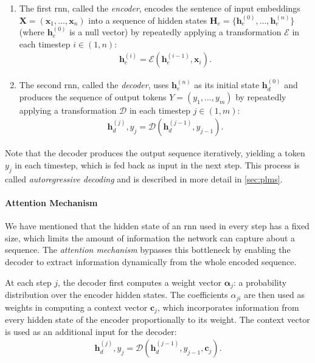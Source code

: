 {\begin{enumerate}
    \item The first \ac{rnn}, called the \emph{encoder}, encodes the sentence of input embeddings $\mathbf{X}= (\mathbf{x}_1, \ldots, \mathbf{x}_n)$ into a sequence of hidden states $\mathbf{H}_e = \{\mathbf{h}_e^{(0)}, \ldots, \mathbf{h}_e^{(n)}\}$ (where $\mathbf{h}_e^{(0)}$ is a null vector) by repeatedly applying a transformation $\mathcal{E}$ in each timestep $i\in(1,n)$:
          \begin{align}
              \mathbf{h}_e^{(i)} = \mathcal{E}(\mathbf{h}_e^{(i-1)}, \mathbf{x}_i).
          \end{align}
    \item The second \ac{rnn}, called the \emph{decoder}, uses $\mathbf{h}_e^{(n)}$ as its initial state $\mathbf{h}_d^{(0)}$ and produces the sequence of output tokens  $Y = (y_1, \ldots, y_m)$ by repeatedly applying a transformation $\mathcal{D}$ in each timestep $j\in(1,m)$:
          \begin{align}
              \mathbf{h}_d^{(j)}, y_j = \mathcal{D}(\mathbf{h}_d^{(j-1)}, y_{j-1}).
          \end{align}
\end{enumerate}

Note that the decoder produces the output sequence iteratively, yielding a token $y_j$ in each timestep, which is fed back as input in the next step. This process is called \emph{autoregressive decoding} and is described in more detail in \autoref{sec:plms}.

\paragraph{Attention Mechanism} We have mentioned that the hidden state of an \ac{rnn} used in every step has a fixed size, which limits the amount of information the network can capture about a sequence. The \emph{attention mechanism} \cite{bahdanau2015neural,luong-etal-2015-effective} bypasses this bottleneck by enabling the decoder to extract information dynamically from the whole encoded sequence.

At each step $j$, the decoder first computes a weight vector $\boldsymbol{\alpha}_j$: a probability distribution over the encoder hidden states. The coefficients $\alpha_{ji}$ are then used as weights in computing a context vector $\mathbf{c}_j$, which incorporates information from every hidden state of the encoder proportionally to its weight. The context vector is used as an additional input for the decoder:
\begin{align}
    \mathbf{h}_d^{(j)}, y_j = \mathcal{D}(\mathbf{h}_d^{(j-1)}, y_{j-1}, \mathbf{c}_j).
\end{align}




}
